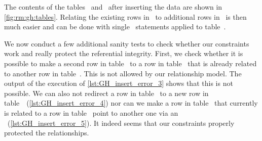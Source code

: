 The contents of the tables~ and~ after inserting the data are shown in \cref{fig:rm:gh:tables}.
Relating the existing rows in~ to additional rows in~ is then much easier and can be done with single ~statements applied to table~.

We now conduct a few additional sanity tests to check whether our constraints work and really protect the referential integrity.
First, we check whether it is possible to make a second row in table~ to a row in table~ that is already related to another row in table~.
This is not allowed by our relationship model.
The output of the execution of \cref{lst:GH_insert_error_3} shows that this is not possible.
We can also not redirect a row in table~ to a new row in table~~(\cref{lst:GH_insert_error_4}) nor can we make a row in table~ that currently is related to a row in table~ point to another one via an ~(\cref{lst:GH_insert_error_5}).
It indeed seems that our constraints properly protected the relationships.%
\FloatBarrier%
\endhsection%
%
